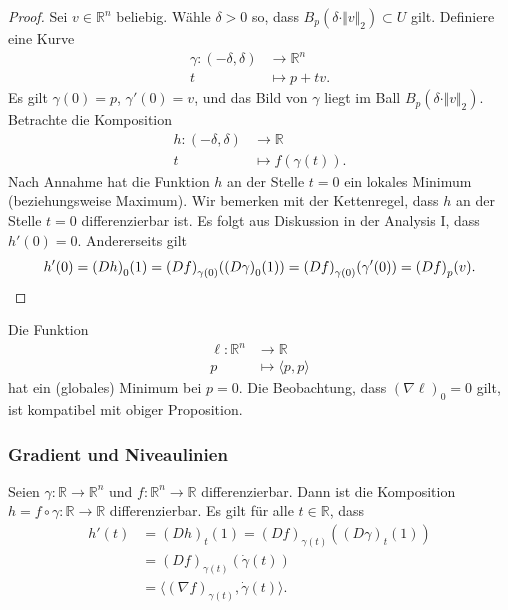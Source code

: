 \documentclass[../main.tex]{subfiles}
\begin{document}
\begin{proof}
  Sei $v \in \mathbb{R}^n$ beliebig.
  Wähle $\delta > 0$ so, dass $B_p(\delta \cdot \Vert v \Vert_2) \subset U$
  gilt.
  Definiere eine Kurve
  \begin{align*}
    \gamma \colon (-\delta, \delta) & \to \mathbb{R}^n \\
    t & \mapsto p + tv.
  \end{align*}
  Es gilt $\gamma(0) = p$, $\gamma'(0) = v$, und das Bild von
  $\gamma$ liegt im Ball $B_p(\delta \cdot \Vert v \Vert_2)$.
  Betrachte die Komposition
  \begin{align*}
    h \colon (-\delta, \delta) & \to \mathbb{R} \\
    t & \mapsto f(\gamma(t)).
  \end{align*}
  Nach Annahme hat die Funktion $h$ an der Stelle $t = 0$
  ein lokales Minimum (beziehungsweise Maximum).
  Wir bemerken mit der Kettenregel,
  dass $h$ an der Stelle $t = 0$
  differenzierbar ist.
  Es folgt aus Diskussion in der Analysis I, dass $h'(0) = 0$.
  Andererseits gilt
  \[
    h'(0) = {(Dh)}_0(1) = {(Df)}_{\gamma(0)}({(D\gamma)}_0(1))
    = {(Df)}_{\gamma(0)}(\gamma'(0)) = {(Df)}_p(v).
    \qedhere
  \]
\end{proof}

\begin{example}
  Die Funktion
  \begin{align*}
    \ell \colon \mathbb{R}^n & \to \mathbb{R} \\
    p & \mapsto \langle p, p \rangle
  \end{align*}
  hat ein (globales) Minimum bei $p = 0$.
  Die Beobachtung, dass ${(\nabla \ell)}_0 = 0$ gilt,
  ist kompatibel mit obiger Proposition.
\end{example}

\subsubsection*{Gradient und Niveaulinien}
Seien $\gamma \colon \mathbb{R} \to \mathbb{R}^n$
und $f \colon \mathbb{R}^n \to \mathbb{R}$ differenzierbar.
Dann ist die Komposition $h = f \circ \gamma \colon \mathbb{R} \to \mathbb{R}$
differenzierbar. Es gilt für alle $t \in \mathbb{R}$, dass
\begin{align*}
   h'(t)
   &= {(Dh)}_t(1) = {(Df)}_{\gamma(t)}({(D\gamma)}_t(1))  \\
   &= {(Df)}_{\gamma(t)}(\dot \gamma(t)) \\
   &= \langle {(\nabla f)}_{\gamma(t)}, \dot \gamma(t) \rangle.
\end{align*}
\end{document}
